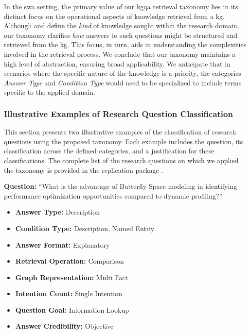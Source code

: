 In the \gls{swa} setting, the primary value of our \gls{kgqa} retrieval taxonomy lies in its distinct focus on the operational aspects of knowledge retrieval from a \gls{kg}. Although \textcite{shaw_writing_2003} and \textcite[287-290]{easterbrook_selecting_2008} define the \emph{kind} of knowledge sought within the research domain, our taxonomy clarifies \emph{how} answers to such questions might be structured and retrieved from the \gls{kg}. This focus, in turn, aids in understanding the complexities involved in the retrieval process. We conclude that our taxonomy maintains a high level of abstraction, ensuring broad applicability. We anticipate that in scenarios where the specific nature of the knowledge is a priority, the categories \emph{Answer Type} and \emph{Condition Type} would need to be specialized to include terms specific to the applied domain.


\subsubsection{Illustrative Examples of Research Question Classification}
This section presents two illustrative examples of the classification of research questions using the proposed taxonomy. Each example includes the question, its classification across the defined categories, and a justification for these classifications. The complete list of the research questions on which we applied the taxonomy is provided in the replication package \cite{schneider_replication_2025}.

\textbf{Question:} \enquote{What is the advantage of Butterfly Space modeling in identifying performance optimization opportunities compared to dynamic profiling?} \cite{zhao_butterfly_2020}
\begin{itemize}[label={}]
    \item \textbf{Answer Type:} Description
    \item \textbf{Condition Type:} Description, Named Entity
    \item \textbf{Answer Format:} Explanatory
    \item \textbf{Retrieval Operation:} Comparison
    \item \textbf{Graph Representation:} Multi Fact
    \item \textbf{Intention Count:} Single Intention
    \item \textbf{Question Goal:} Information Lookup
    \item \textbf{Answer Credibility:} Objective
\end{itemize}

